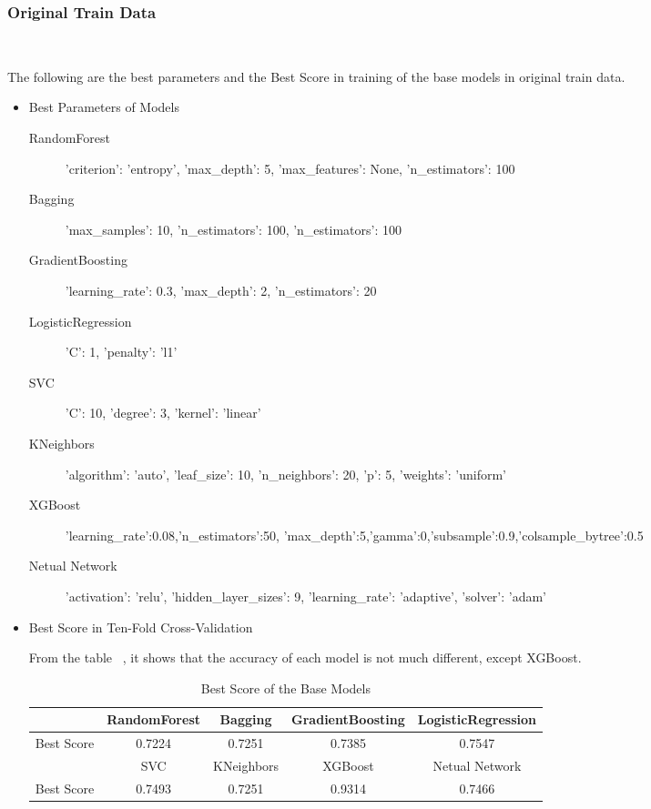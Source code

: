 \subsubsection{Original Train Data}
\

The following are the best parameters and 
the Best Score in training of 
the base models 
in original train data. 

\begin{itemize}
	\item Best Parameters of Models
	\begin{description}
		\item[RandomForest] 'criterion': 'entropy', 'max_depth': 5, 
		'max_features': None, 'n_estimators': 100
		\item[Bagging] 'max_samples': 10, 'n_estimators': 100,
		'n_estimators': 100
		\item[GradientBoosting] 'learning_rate': 0.3, 'max_depth': 2, 
		'n_estimators': 20
		\item[LogisticRegression] 'C': 1, 'penalty': 'l1'
		\item[SVC] 'C': 10, 'degree': 3, 'kernel': 'linear'
		\item[KNeighbors] 'algorithm': 'auto', 'leaf_size': 10, 
		'n_neighbors': 20, 'p': 5, 'weights': 'uniform'
		\item[XGBoost] 'learning_rate':0.08,'n_estimators':50,
		'max_depth':5,'gamma':0,'subsample':0.9,'colsample_bytree':0.5
		\item[Netual Network] 'activation': 'relu', 'hidden_layer_sizes': 9, 
		'learning_rate': 'adaptive', 'solver': 'adam'
	\end{description}
	
	\item Best Score in Ten-Fold Cross-Validation
	
	From the table ~,
	it shows that the accuracy of 
	each model is not much different,
	except XGBoost.
	
	\begin{table}[h]  \centering
		\caption{Best Score of the Base Models}
		\label{tbl:best_score_base_models_old}
		\begin{tabular}{ccccc}
			\toprule
			& RandomForest & Bagging & GradientBoosting & 
			LogisticRegression \\
			\midrule
			Best Score & 0.7224 & 0.7251 & 0.7385 & 
			0.7547\\
			\bottomrule
			\toprule
			& SVC & KNeighbors & XGBoost & Netual Network\\
			\midrule
			Best Score & 0.7493 & 0.7251 & 0.9314 & 0.7466\\
			\bottomrule
		\end{tabular}
	\end{table}
\end{itemize}

